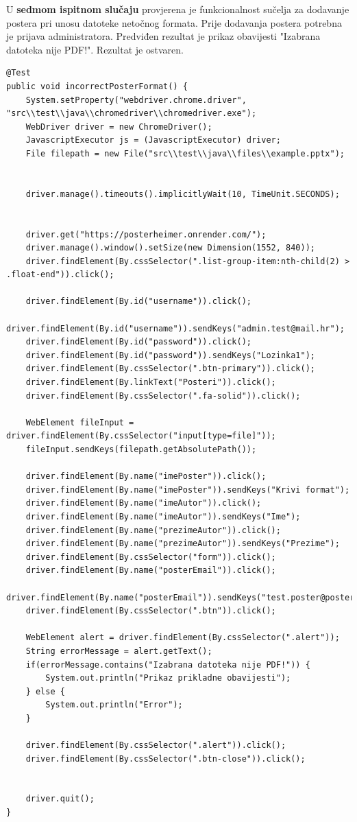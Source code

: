 		U \textbf{sedmom ispitnom slučaju} provjerena je funkcionalnost sučelja za dodavanje postera pri unosu datoteke netočnog formata. Prije dodavanja postera potrebna je prijava administratora. Predviđen rezultat je prikaz obavijesti "Izabrana datoteka nije PDF!". Rezultat je ostvaren.  
		
	\begin{lstlisting}
@Test
public void incorrectPosterFormat() {
	System.setProperty("webdriver.chrome.driver", "src\\test\\java\\chromedriver\\chromedriver.exe");
	WebDriver driver = new ChromeDriver();
	JavascriptExecutor js = (JavascriptExecutor) driver;
	File filepath = new File("src\\test\\java\\files\\example.pptx");
	
	
	driver.manage().timeouts().implicitlyWait(10, TimeUnit.SECONDS);
	
	
	driver.get("https://posterheimer.onrender.com/");
	driver.manage().window().setSize(new Dimension(1552, 840));
	driver.findElement(By.cssSelector(".list-group-item:nth-child(2) > .float-end")).click();	  
	
	driver.findElement(By.id("username")).click();
	driver.findElement(By.id("username")).sendKeys("admin.test@mail.hr");
	driver.findElement(By.id("password")).click();
	driver.findElement(By.id("password")).sendKeys("Lozinka1");
	driver.findElement(By.cssSelector(".btn-primary")).click();
	driver.findElement(By.linkText("Posteri")).click();
	driver.findElement(By.cssSelector(".fa-solid")).click();
	
	WebElement fileInput = driver.findElement(By.cssSelector("input[type=file]"));
	fileInput.sendKeys(filepath.getAbsolutePath());
	
	driver.findElement(By.name("imePoster")).click();
	driver.findElement(By.name("imePoster")).sendKeys("Krivi format");
	driver.findElement(By.name("imeAutor")).click();
	driver.findElement(By.name("imeAutor")).sendKeys("Ime");
	driver.findElement(By.name("prezimeAutor")).click();
	driver.findElement(By.name("prezimeAutor")).sendKeys("Prezime");
	driver.findElement(By.cssSelector("form")).click();
	driver.findElement(By.name("posterEmail")).click();
	driver.findElement(By.name("posterEmail")).sendKeys("test.poster@posterheimer.hr");
	driver.findElement(By.cssSelector(".btn")).click();
	
	WebElement alert = driver.findElement(By.cssSelector(".alert"));
	String errorMessage = alert.getText();
	if(errorMessage.contains("Izabrana datoteka nije PDF!")) {
		System.out.println("Prikaz prikladne obavijesti");
	} else {
		System.out.println("Error");
	}		
	
	driver.findElement(By.cssSelector(".alert")).click();
	driver.findElement(By.cssSelector(".btn-close")).click();
	
	
	driver.quit();
}
	\end{lstlisting}
			
